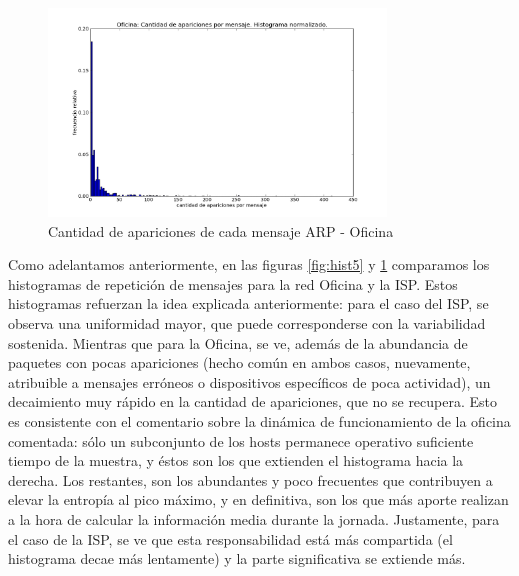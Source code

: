 \begin{figure}[H]
	\centering
	\includegraphics[width=0.8\textwidth]{graficos/hist_oficina.png}
	\caption{Cantidad de apariciones de cada mensaje ARP - Oficina}
	\label{fig:hist6}
\end{figure}

Como adelantamos anteriormente, en las figuras \ref{fig:hist5} y \ref{fig:hist6} comparamos los histogramas de repetición de mensajes para la red Oficina y la ISP.  Estos histogramas refuerzan la idea explicada anteriormente: para el caso del ISP, se observa una uniformidad mayor, que puede corresponderse con la variabilidad sostenida. Mientras que para la Oficina, se ve, además de la abundancia de paquetes con pocas apariciones (hecho común en ambos casos, nuevamente, atribuible a mensajes erróneos o dispositivos específicos de poca actividad), un decaimiento muy rápido en la cantidad de apariciones, que no se recupera. Esto es consistente con el comentario sobre la dinámica de funcionamiento de la oficina comentada: sólo un subconjunto de los hosts permanece operativo suficiente tiempo de la muestra, y éstos son los que extienden el histograma hacia la derecha. Los restantes, son los abundantes y poco frecuentes que contribuyen a elevar la entropía al pico máximo, y en definitiva, son los que más aporte realizan a la hora de calcular la información media durante la jornada. Justamente, para el caso de la ISP, se ve que esta responsabilidad está más compartida (el histograma decae más lentamente) y la parte significativa se extiende más.

